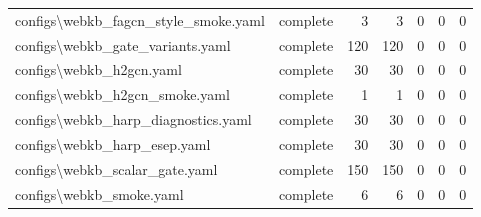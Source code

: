 \begin{tabular}{llrrrrr}
configs\textbackslash{}webkb\_fagcn\_style\_smoke.yaml & complete & 3 & 3 & 0 & 0 & 0 \\
configs\textbackslash{}webkb\_gate\_variants.yaml & complete & 120 & 120 & 0 & 0 & 0 \\
configs\textbackslash{}webkb\_h2gcn.yaml & complete & 30 & 30 & 0 & 0 & 0 \\
configs\textbackslash{}webkb\_h2gcn\_smoke.yaml & complete & 1 & 1 & 0 & 0 & 0 \\
configs\textbackslash{}webkb\_harp\_diagnostics.yaml & complete & 30 & 30 & 0 & 0 & 0 \\
configs\textbackslash{}webkb\_harp\_esep.yaml & complete & 30 & 30 & 0 & 0 & 0 \\
configs\textbackslash{}webkb\_scalar\_gate.yaml & complete & 150 & 150 & 0 & 0 & 0 \\
configs\textbackslash{}webkb\_smoke.yaml & complete & 6 & 6 & 0 & 0 & 0 \\
\bottomrule
\end{tabular}

